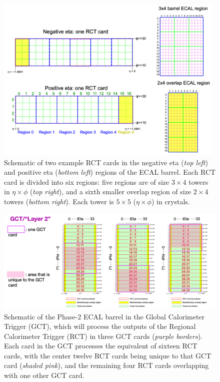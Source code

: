 \begin{figure}[ht]
    \centering
    \includegraphics[width=11cm]{figures/ch-3-phase2/phase-2-one-rct-card-schematic-landscape.png}
    \caption{Schematic of two example RCT cards in the negative eta (\textit{top left}) and positive eta (\textit{bottom left}) regions of the ECAL barrel. Each RCT card is divided into six regions: five regions are of size $3 \times 4$ towers in $\eta \times \phi$ (\textit{top right}), and a sixth smaller overlap region of size $2 \times 4$ towers (\textit{bottom right}). Each tower is $5 \times 5$ ($\eta\times\phi$) in crystals.}
    \label{fig:phase-2-one-rct-card-schematic-landscape}
\end{figure}


\begin{figure}[ht]
    \centering
    \includegraphics[width=15cm]{figures/ch-3-phase2/phase-2-gct-cards-schematic.png}
    \caption{Schematic of the Phase-2 ECAL barrel in the Global Calorimeter Trigger (GCT), which will process the outputs of the Regional Calorimeter Trigger (RCT) in three GCT cards (\textit{purple borders}). Each card in the GCT processes the equivalent of sixteen RCT cards, with the center twelve RCT cards being unique to that GCT card (\textit{shaded pink}), and the remaining four RCT cards overlapping with one other GCT card.}
    \label{fig:phase-2-gct-cards-schematic}
\end{figure}

